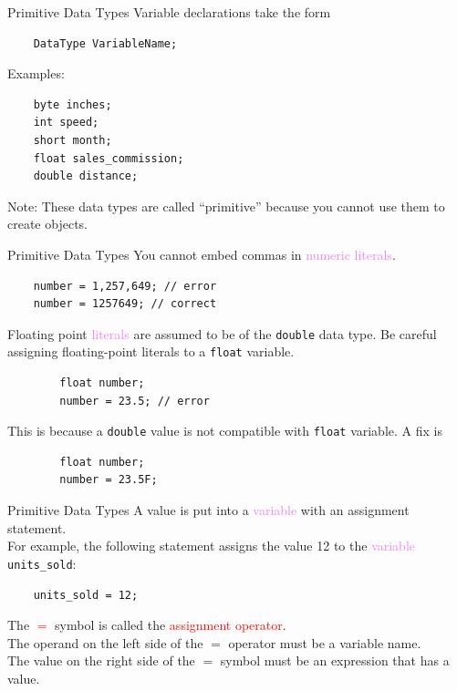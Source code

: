 \documentclass[11pt]{beamer}
\newcommand{\red}[1]{\textcolor{red}{#1}}
\newcommand{\violet}[1]{\textcolor{violet}{#1}}
\begin{document}
\begin{frame}[fragile]{Primitive Data Types}
    Variable declarations take the form
    \begin{lstlisting}
    DataType VariableName;
    \end{lstlisting}
    Examples:
    \begin{lstlisting}
    byte inches;
    int speed;
    short month;
    float sales_commission;
    double distance;
    \end{lstlisting}
    Note: These data types are called ``primitive'' because you cannot use them to create objects.
\end{frame}

\begin{frame}[fragile]{Primitive Data Types}
    You cannot embed commas in \violet{numeric literals}.
    \begin{lstlisting}
    number = 1,257,649; // error
    number = 1257649; // correct
    \end{lstlisting}
    Floating point \violet{literals} are assumed to be of the \texttt{double} data type. Be careful assigning floating-point literals to a \texttt{float} variable.
    \begin{lstlisting}
        float number;
        number = 23.5; // error
    \end{lstlisting}
    This is because a \texttt{double} value is not compatible with \texttt{float} variable. A fix is
    \begin{lstlisting}
        float number;
        number = 23.5F;
    \end{lstlisting}
\end{frame}

\begin{frame}[fragile]{Primitive Data Types}
    A value is put into a \violet{variable} with an assignment statement. \\ \vspace{1em}
    For example, the following statement assigns the value 12 to the \violet{variable} \texttt{units\_sold}:
    \begin{lstlisting}
    units_sold = 12;
    \end{lstlisting}
    The \red{$=$} symbol is called the \red{assignment operator}. \\ \vspace{1em}
    The operand on the left side of the $=$ operator must be a variable name. \\ \vspace{1em}
    The value on the right side of the $=$ symbol must be an expression that has a value.
\end{frame}
\end{document}
